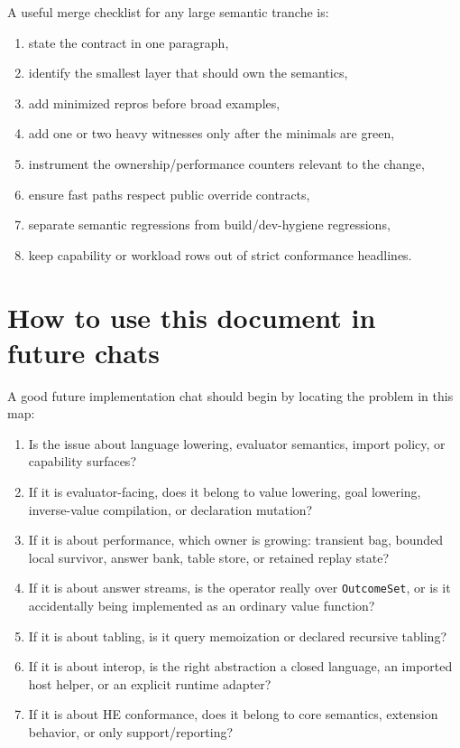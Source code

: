 \documentclass[11pt]{article}
\begin{document}
A useful merge checklist for any large semantic tranche is:
\begin{enumerate}
    \item state the contract in one paragraph,
    \item identify the smallest layer that should own the semantics,
    \item add minimized repros before broad examples,
    \item add one or two heavy witnesses only after the minimals are green,
    \item instrument the ownership/performance counters relevant to the change,
    \item ensure fast paths respect public override contracts,
    \item separate semantic regressions from build/dev-hygiene regressions,
    \item keep capability or workload rows out of strict conformance headlines.
\end{enumerate}

\section{How to use this document in future chats}

A good future implementation chat should begin by locating the problem in this map:
\begin{enumerate}
    \item Is the issue about language lowering, evaluator semantics, import policy, or capability surfaces?
    \item If it is evaluator-facing, does it belong to value lowering, goal lowering, inverse-value compilation, or declaration mutation?
    \item If it is about performance, which owner is growing: transient bag, bounded local survivor, answer bank, table store, or retained replay state?
    \item If it is about answer streams, is the operator really over \texttt{OutcomeSet}, or is it accidentally being implemented as an ordinary value function?
    \item If it is about tabling, is it query memoization or declared recursive tabling?
    \item If it is about interop, is the right abstraction a closed language, an imported host helper, or an explicit runtime adapter?
    \item If it is about HE conformance, does it belong to core semantics, extension behavior, or only support/reporting?
\end{enumerate}
\end{document}
